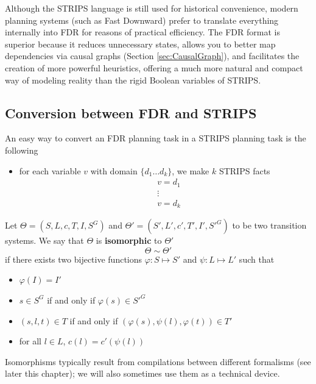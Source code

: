 \documentclass[10pt, letterpaper]{report}
\begin{document}
Although the STRIPS language is still used for historical convenience, modern planning systems (such as Fast Downward) prefer to translate everything internally into FDR for reasons of practical efficiency. The FDR format is superior because it reduces unnecessary states, allows you to better map dependencies via causal graphs (Section \ref{sec:CausalGraph}), and facilitates the creation of more powerful heuristics, offering a much more natural and compact way of modeling reality than the rigid Boolean variables of STRIPS.
\subsection{Conversion between FDR and STRIPS}
An easy way to convert an FDR planning task in a STRIPS planning task is the following\begin{itemize}
    \item for each variable $v$ with domain $\{d_1\dots d_k\}$, we make $k$ STRIPS facts \begin{align*}
        &v=d_1\\ 
        &\vdots \\ 
        &v=d_k
    \end{align*}
\end{itemize}
\begin{definition}
    Let $\Theta=(S,L,c,T,I,S^G)$ and $\Theta'=(S',L',c',T',I',{S'}^G)$ to be two transition systems. We say that $\Theta$ is \textbf{isomorphic} to $\Theta'$ $$ \Theta\sim \Theta'$$
    if there exists two bijective functions $\varphi:S\mapsto S'$ and $\psi:L\mapsto L'$ such that\begin{itemize}
        \item $\varphi(I)=I'$
        \item $s\in S^G$ if and only if $\varphi(s)\in {S'}^G$
        \item $(s,l,t)\in T$ if and only if $(\varphi(s),\psi(l),\varphi(t))\in T'$
        \item for all $l\in L$, $c(l)=c'(\psi(l))$
    \end{itemize}
\end{definition}
Isomorphisms typically result from compilations between different
 formalisms (see later this chapter); we will also sometimes use them as a
 technical device.
\end{document}
